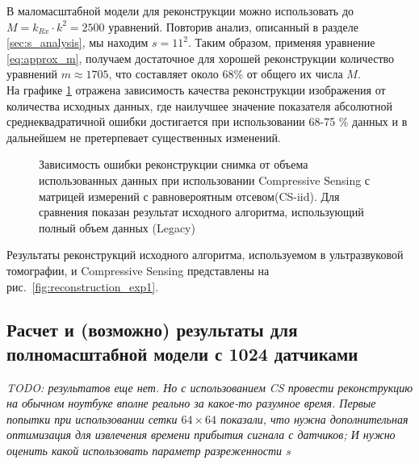 \documentclass[14pt]{matmex-diploma}
\begin{document}
В маломасштабной модели для реконструкции можно использовать до $M = k_{Rx} \cdot k^2 = 2500$ уравнений. Повторив анализ, описанный в разделе \ref{sec:s_analysis}, мы находим $s=11^2$. 
Таким образом, применяя уравнение \eqref{eq:approx_m}, получаем достаточное для хорошей реконструкции количество уравнений $m \approx 1705$, что составляет около 68\% от общего их числа $M$. \\
На графике \ref{fig:used_equations} отражена зависимость качества реконструкции изображения от количества исходных данных, где наилучшее значение показателя абсолютной среднеквадратичной ошибки  достигается при использовании 68-75 \% данных и в дальнейшем не претерпевает существенных изменений.

\begin{figure}[h]
\centering
    \caption{Зависимость ошибки реконструкции снимка от объема использованных данных при использовании Compressive Sensing с матрицей измерений с равновероятным отсевом(CS-iid). Для сравнения показан результат исходного алгоритма, использующий полный объем данных (Legacy)}
    \label{fig:used_equations}
\end{figure}

Результаты реконструкций исходного алгоритма, используемом в ультразвуковой томографии, и Compressive Sensing представлены на рис.~\ref{fig:reconstruction_exp1}.




\subsection{Расчет и (возможно) результаты для полномасштабной модели с 1024 датчиками}
\textit{TODO: результатов еще нет. Но с использованием CS провести реконструкцию на обычном ноутбуке вполне реально за какое-то разумное время. Первые попытки при использовании сетки $64\times 64$ показали, что нужна дополнительная оптимизация для извлечения времени прибытия сигнала с датчиков; И нужно оценить какой использовать параметр разреженности s}\\
\end{document}
